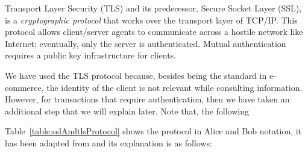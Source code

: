 Transport Layer Security (TLS) and its predecessor, Secure Socket
Layer (SSL), is a \emph{cryptographic protocol} that works over the transport 
layer of TCP/IP. This protocol allows client/server agents to communicate 
across a hostile network like Internet; eventually, only the server is authenticated. 
Mutual authentication requires a public key infrastructure for clients. 

We have used the TLS protocol because, besides being the 
standard in e-commerce, the identity of the client is not
relevant while consulting information. However, for transactions that 
require authentication, then we have taken an additional step that we will 
explain later. Note that, the following   

Table~\ref{table:sslAndtlsProtocol} shows the protocol in Alice and Bob 
notation, it has been adapted from \cite{lopez13} and its explanation is as follows:
